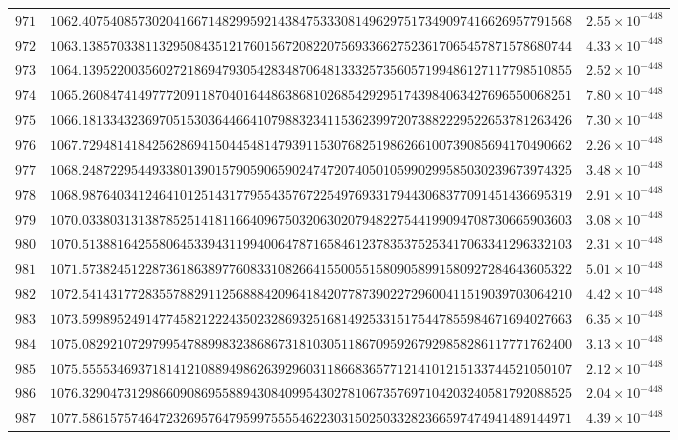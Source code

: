 \documentclass[12pt,reqno]{amsart}
\theoremstyle{remark}
\begin{document}
\begin{longtable}{clc}
$971$ & $1062.4075408573020416671482995921438475333081496297517349097416626957791568$ & $2.55\times 10^{-448}$ \\
$972$ & $1063.1385703381132950843512176015672082207569336627523617065457871578680744$ & $4.33\times 10^{-448}$ \\
$973$ & $1064.1395220035602721869479305428348706481333257356057199486127117798510855$ & $2.52\times 10^{-448}$ \\
$974$ & $1065.2608474149777209118704016448638681026854292951743984063427696550068251$ & $7.80\times 10^{-448}$ \\
$975$ & $1066.1813343236970515303644664107988323411536239972073882229522653781263426$ & $7.30\times 10^{-448}$ \\
$976$ & $1067.7294814184256286941504454814793911530768251986266100739085694170490662$ & $2.26\times 10^{-448}$ \\
$977$ & $1068.2487229544933801390157905906590247472074050105990299585030239673974325$ & $3.48\times 10^{-448}$ \\
$978$ & $1068.9876403412464101251431779554357672254976933179443068377091451436695319$ & $2.91\times 10^{-448}$ \\
$979$ & $1070.0338031313878525141811664096750320630207948227544199094708730665903603$ & $3.08\times 10^{-448}$ \\
$980$ & $1070.5138816425580645339431199400647871658461237835375253417063341296332103$ & $2.31\times 10^{-448}$ \\
$981$ & $1071.5738245122873618638977608331082664155005515809058991580927284643605322$ & $5.01\times 10^{-448}$ \\
$982$ & $1072.5414317728355788291125688842096418420778739022729600411519039703064210$ & $4.42\times 10^{-448}$ \\
$983$ & $1073.5998952491477458212224350232869325168149253315175447855984671694027663$ & $6.35\times 10^{-448}$ \\
$984$ & $1075.0829210729799547889983238686731810305118670959267929858286117771762400$ & $3.13\times 10^{-448}$ \\
$985$ & $1075.5555346937181412108894986263929603118668365771214101215133744521050107$ & $2.12\times 10^{-448}$ \\
$986$ & $1076.3290473129866090869558894308409954302781067357697104203240581792088525$ & $2.04\times 10^{-448}$ \\
$987$ & $1077.5861575746472326957647959975555462230315025033282366597474941489144971$ & $4.39\times 10^{-448}$ \\

\end{longtable}
\end{document}
